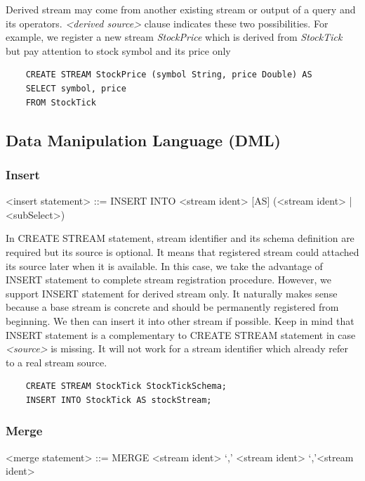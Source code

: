 Derived stream may come from another existing stream or output of a query and its operators. \textit{<derived source>} clause indicates these two possibilities. For example, we register a new stream \textit{StockPrice} which is derived from \textit{StockTick} but pay attention to stock symbol and its price only
\begin{lstlisting}
	CREATE STREAM StockPrice (symbol String, price Double) AS
	SELECT symbol, price 
	FROM StockTick
\end{lstlisting}


\subsection{Data Manipulation Language (DML)}

\subsubsection{Insert}

\begin{grammar}
<insert statement> ::= INSERT INTO <stream ident> [AS] 
							(<stream ident> | <subSelect>)
\end{grammar}

In CREATE STREAM statement, stream identifier and its schema definition are required but its source is optional. It means that registered stream could attached its source later when it is available. In this case, we take the advantage of INSERT statement to complete stream registration procedure. However, we support INSERT statement for derived stream only. It naturally makes sense because a base stream is concrete and should be permanently registered from beginning. We then can insert it into other stream if possible.
Keep in mind that INSERT statement is a complementary to CREATE STREAM statement in case \textit{<source>} is missing. It will not work for a stream identifier which already refer to a real stream source.

\begin{verbatim}
	CREATE STREAM StockTick StockTickSchema;
	INSERT INTO StockTick AS stockStream;
\end{verbatim}


\subsubsection{Merge}
\begin{grammar}
<merge statement> ::= MERGE <stream ident> `,' <stream ident> {`,'<stream ident>}
\end{grammar}

